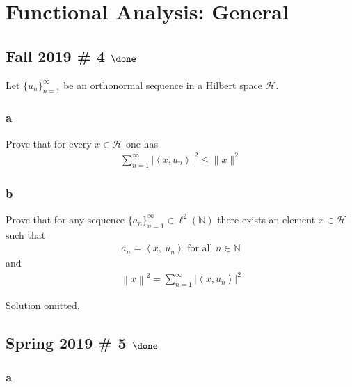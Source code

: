 \hypertarget{functional-analysis-general}{%
\section{Functional Analysis:
General}\label{functional-analysis-general}}

\hypertarget{fall-2019-4-done}{%
\subsection{\texorpdfstring{Fall 2019 \# 4
\(\done\)}{Fall 2019 \# 4 \textbackslash done}}\label{fall-2019-4-done}}

Let \(\{u_n\}_{n=1}^∞\) be an orthonormal sequence in a Hilbert space
\(\mathcal{H}\).

\hypertarget{a-14}{%
\subsubsection{a}\label{a-14}}

Prove that for every \(x ∈ \mathcal H\) one has
\begin{align*}
\displaystyle\sum_{n=1}^{\infty}\left|\left\langle x, u_{n}\right\rangle\right|^{2} \leq\|x\|^{2}
\end{align*}

\hypertarget{b-13}{%
\subsubsection{b}\label{b-13}}

Prove that for any sequence
\(\{a_n\}_{n=1}^\infty \in \ell^2({\mathbb{N}})\) there exists an
element \(x\in\mathcal H\) such that
\begin{align*}
a_n = {\left\langle {x},~{u_n} \right\rangle} \text{ for all } n\in {\mathbb{N}}
\end{align*}
and
\begin{align*}
{\left\lVert {x} \right\rVert}^2 = \sum_{n=1}^{\infty}\left|\left\langle x, u_{n}\right\rangle\right|^{2}
\end{align*}

Solution omitted.

\hypertarget{spring-2019-5-done}{%
\subsection{\texorpdfstring{Spring 2019 \# 5
\(\done\)}{Spring 2019 \# 5 \textbackslash done}}\label{spring-2019-5-done}}

\hypertarget{a-16}{%
\subsubsection{a}\label{a-16}}

